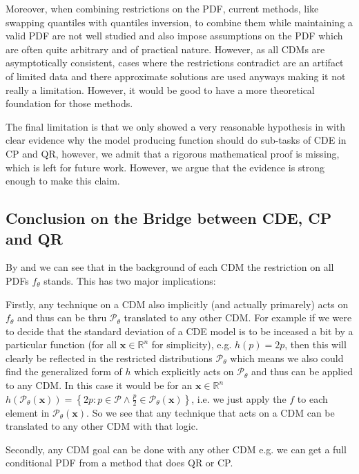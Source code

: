 Moreover, when combining restrictions on the PDF, current methods, like swapping quantiles with quantiles inversion, to combine them while maintaining a valid PDF are not well studied and also impose assumptions on the PDF which are often quite arbitrary and of practical nature. However, as all CDMs are asymptotically consistent, cases where the restrictions contradict are an artifact of limited data and there approximate solutions are used anyways making it not really a limitation. However, it would be good to have a more theoretical foundation for those methods.

The final limitation is that we only showed a very reasonable hypothesis in  with clear evidence why the model producing function should do sub-tasks of CDE in CP and QR, however, we admit that a rigorous mathematical proof is missing, which is left for future work. However, we argue that the evidence is strong enough to make this claim.

\subsection{Conclusion on the Bridge between CDE, CP and QR}

By  and  we can see that in the background of each CDM the restriction on all PDFs $f_\theta$ stands. This has two major implications:

Firstly, any technique on a CDM also implicitly (and actually primarely) acts on $f_\theta$ and thus can be thru $\mathscr{P}_\theta$ translated to any other CDM. For example if we were to decide that the standard deviation of a CDE model is to be inceased a bit by a particular function (for all $\mathbf{x} \in \mathbb{R}^n$ for simplicity), e.g. $h(p) = 2 p $, then this will clearly be reflected in the restricted distributions $\mathscr{P}_\theta$ which means we also could find the generalized form of $h$ which explicitly acts on $\mathscr{P}_\theta$ and thus can be applied to any CDM. In this case it would be for an $\mathbf{x} \in \mathbb{R}^n$ $h(\mathscr{P}_{\theta}(\mathbf{x})) = \left\{2 p: p \in \mathcal{P} \land \frac{p}{2} \in \mathscr{P}_\theta(\mathbf{x}) \right\}$, i.e. we just apply the $f$ to each element in $\mathscr{P}_\theta(\mathbf{x})$. So we see that any technique that acts on a CDM can be translated to any other CDM with that logic.

Secondly, any CDM goal can be done with any other CDM e.g. we can get a full conditional PDF from a method that does QR or CP.

